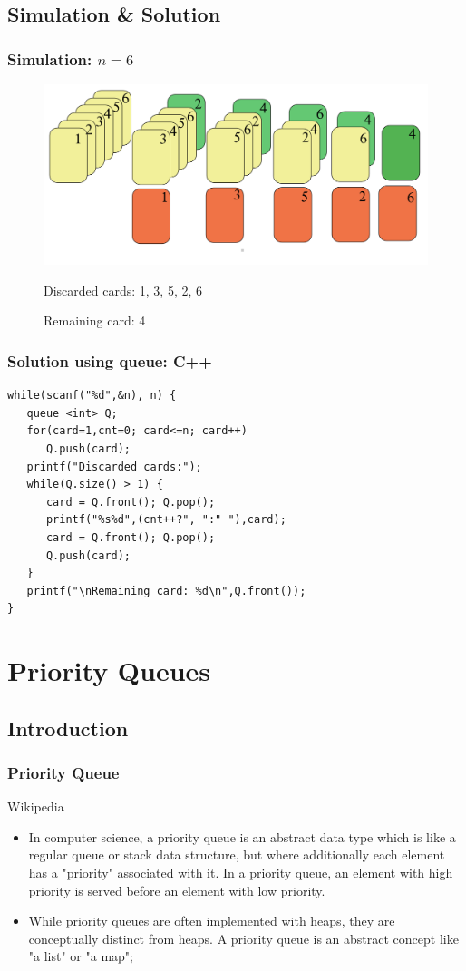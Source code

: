 \documentclass{beamer}
\begin{document}
\subsection{Simulation \& Solution}
\begin{frame}
\frametitle{ Simulation: $n = 6$ }
\begin{figure}
	\includegraphics[width=0.9\linewidth]{throwing.png}
	\caption{Discarded cards: 1, 3, 5, 2, 6}
	\caption{Remaining card: 4}
\end{figure}
\end{frame}
\begin{frame}[fragile]
\frametitle{ Solution using queue: C++ }
\begin{example}[ C++ Implementation ]
\begin{lstlisting}
while(scanf("%d",&n), n) {
   queue <int> Q;
   for(card=1,cnt=0; card<=n; card++)
      Q.push(card);
   printf("Discarded cards:");
   while(Q.size() > 1) {
      card = Q.front(); Q.pop();
      printf("%s%d",(cnt++?", ":" "),card);
      card = Q.front(); Q.pop();
      Q.push(card);
   }
   printf("\nRemaining card: %d\n",Q.front());
}
\end{lstlisting}
\end{example}
\end{frame}
\section{Priority Queues} 
\subsection{Introduction}
\begin{frame}
\frametitle{Priority Queue}
\begin{block}{Wikipedia}
\begin{itemize}
\item In computer science, a priority queue is an abstract data type which is like a regular queue or stack data structure, but where additionally each element has a "priority" associated with it. In a priority queue, an element with high  priority is served before an element with low priority. 
\\
\item While priority queues are often implemented with heaps, they are conceptually distinct from heaps. A priority queue is an abstract concept like "a list" or "a map";
\end{itemize}
\end{block}
\end{frame}
\end{document}
